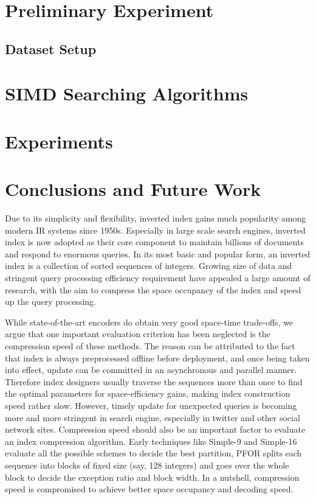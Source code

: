\documentclass[runningheads,a4paper]{llncs}
\begin{document}
\section{Preliminary Experiment}
\subsection{Dataset Setup}
\section{SIMD Searching Algorithms}
\section{Experiments}
\section{Conclusions and Future Work}

Due to its simplicity and flexibility, inverted index gains much popularity among modern IR systems since 1950s. Especially in large scale search engines, inverted index is now adopted as their core component to maintain billions of documents and respond to enormous queries. In its most basic and popular form, an inverted index is a collection of sorted sequences of integers\cite{manning2008introduction,witten1999managing,zobel2006inverted}. Growing size of data and stringent query processing efficiency requirement have appealed a large amount of research, with the aim to compress the space occupancy of the index and speed up the query processing.

While state-of-the-art encoders do obtain very good space-time trade-offs, we argue that one important evaluation criterion has been neglected is the compression speed of these methods\cite{manning2008introduction,silvestri2010vsencoding,yan2009inverted}. The reason can be attributed to the fact that index is always preprocessed offline before deployment, and once being taken into effect, update can be committed in an asynchronous and parallel manner. Therefore index designers usually traverse the sequences more than once to find the optimal parameters for space-efficiency gains, making index construction speed rather slow. However, timely update for unexpected queries is becoming more and more stringent in search engine, especially in twitter and other social network sites. Compression speed should also be an important factor to evaluate an index compression algorithm. Early techniques like Simple-9 and Simple-16\cite{anh2005inverted,anh2010index} evaluate all the possible schemes to decide the best partition, PFOR\cite{lemire2015decoding,yan2009inverted,zobel2006inverted} splits each sequence into blocks of fixed size (say, 128 integers) and goes over the whole block to decide the exception ratio and block width. In a nutshell, compression speed is compromised to achieve better space occupancy and decoding speed.
\end{document}
